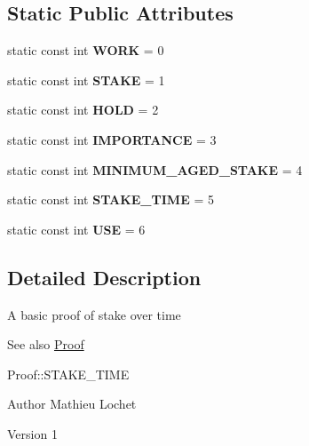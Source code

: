 \subsection*{Static Public Attributes}
\begin{DoxyCompactItemize}
\item 
\mbox{\label{classProof_a457d231986439ee6bcc945daacfc28fc}} 
static const int {\bfseries W\+O\+RK} = 0
\item 
\mbox{\label{classProof_acf157976c3c86ef2fd0e838b8c4ac992}} 
static const int {\bfseries S\+T\+A\+KE} = 1
\item 
\mbox{\label{classProof_ae5c2a86640bf558ff5625157e23b3eec}} 
static const int {\bfseries H\+O\+LD} = 2
\item 
\mbox{\label{classProof_a4e71a5e5928900794353acdd169ca652}} 
static const int {\bfseries I\+M\+P\+O\+R\+T\+A\+N\+CE} = 3
\item 
\mbox{\label{classProof_a1a08ffc465f4fcfde396d4c4feb22eb0}} 
static const int {\bfseries M\+I\+N\+I\+M\+U\+M\+\_\+\+A\+G\+E\+D\+\_\+\+S\+T\+A\+KE} = 4
\item 
\mbox{\label{classProof_a1aa2cb91c5be4ca021714ff6fc01da4a}} 
static const int {\bfseries S\+T\+A\+K\+E\+\_\+\+T\+I\+ME} = 5
\item 
\mbox{\label{classProof_a3f6898fa1d652d32182c3c387c8e979c}} 
static const int {\bfseries U\+SE} = 6
\end{DoxyCompactItemize}


\subsection{Detailed Description}
A basic proof of stake over time \begin{DoxySeeAlso}{See also}
\mbox{\hyperlink{classProof}{Proof}} 

Proof\+::\+S\+T\+A\+K\+E\+\_\+\+T\+I\+ME
\end{DoxySeeAlso}
\begin{DoxyAuthor}{Author}
Mathieu Lochet 
\end{DoxyAuthor}
\begin{DoxyVersion}{Version}
1 
\end{DoxyVersion}


